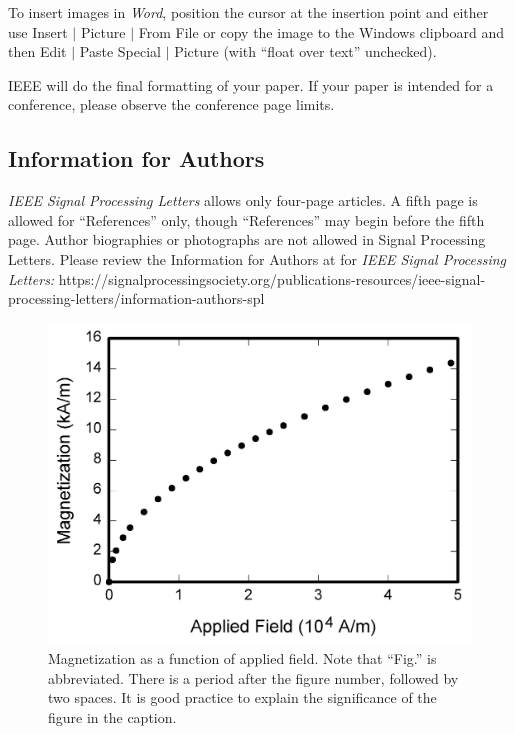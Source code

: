 \documentclass[journal]{IEEEtran}
\begin{document}
To insert images in {\em Word}, position the cursor at the insertion point and either use Insert $\mid$ Picture $\mid$ From File or copy the image to the Windows clipboard and then Edit $\mid$ Paste Special $\mid$ Picture (with ``float over text'' unchecked). 

IEEE will do the final formatting of your paper. If your paper is intended for a conference, please observe the conference page limits. 


\subsection{Information for Authors}

{\em IEEE Signal Processing Letters} allows only four-page articles. A fifth page is allowed for ``References'' only, though ``References'' may begin before the fifth page. Author biographies or photographs are not allowed in Signal Processing Letters. Please review the Information for Authors at for {\em IEEE Signal Processing Letters:} https://signalprocessingsociety.org/publications-resources/ieee-signal-processing-letters/information-authors-spl

\begin{figure}
\centerline{\includegraphics[width=\columnwidth]{fig1.png}}
\caption{Magnetization as a function of applied field. Note that ``Fig.'' is abbreviated. There is a period after the figure number, followed by two spaces. It is good practice to explain the significance of the figure in the caption.}
\end{figure}
\end{document}
